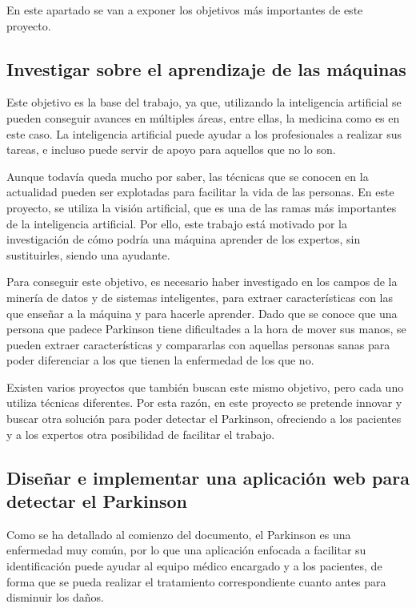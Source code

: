 
En este apartado se van a exponer los objetivos más importantes de este proyecto.

\subsection{Investigar sobre el aprendizaje de las máquinas}
Este objetivo es la base del trabajo, ya que, utilizando la inteligencia artificial se pueden conseguir avances en múltiples áreas, entre ellas, la medicina como es en este caso. La inteligencia artificial puede ayudar a los profesionales a realizar sus tareas, e incluso puede servir de apoyo para aquellos que no lo son.

Aunque todavía queda mucho por saber, las técnicas que se conocen en la actualidad pueden ser explotadas para facilitar la vida de las personas. En este proyecto, se utiliza la visión artificial, que es una de las ramas más importantes de la inteligencia artificial. Por ello, este trabajo está motivado por la investigación de cómo podría una máquina aprender de los expertos, sin sustituirles, siendo una ayudante.

Para conseguir este objetivo, es necesario haber investigado en los campos de la minería de datos y de sistemas inteligentes, para extraer características con las que enseñar a la máquina y para hacerle aprender. Dado que se conoce que una persona que padece Parkinson tiene dificultades a la hora de mover sus manos, se pueden extraer características y compararlas con aquellas personas sanas para poder diferenciar a los que tienen la enfermedad de los que no.

Existen varios proyectos que también buscan este mismo objetivo, pero cada uno utiliza técnicas diferentes. Por esta razón, en este proyecto se pretende innovar y buscar otra solución para poder detectar el Parkinson, ofreciendo a los pacientes y a los expertos otra posibilidad de facilitar el trabajo.

\subsection{Diseñar e implementar una aplicación web para detectar el Parkinson}
Como se ha detallado al comienzo del documento, el Parkinson es una enfermedad muy común, por lo que una aplicación enfocada a facilitar su identificación puede ayudar al equipo médico encargado y a los pacientes, de forma que se pueda realizar el tratamiento correspondiente cuanto antes para disminuir los daños.

